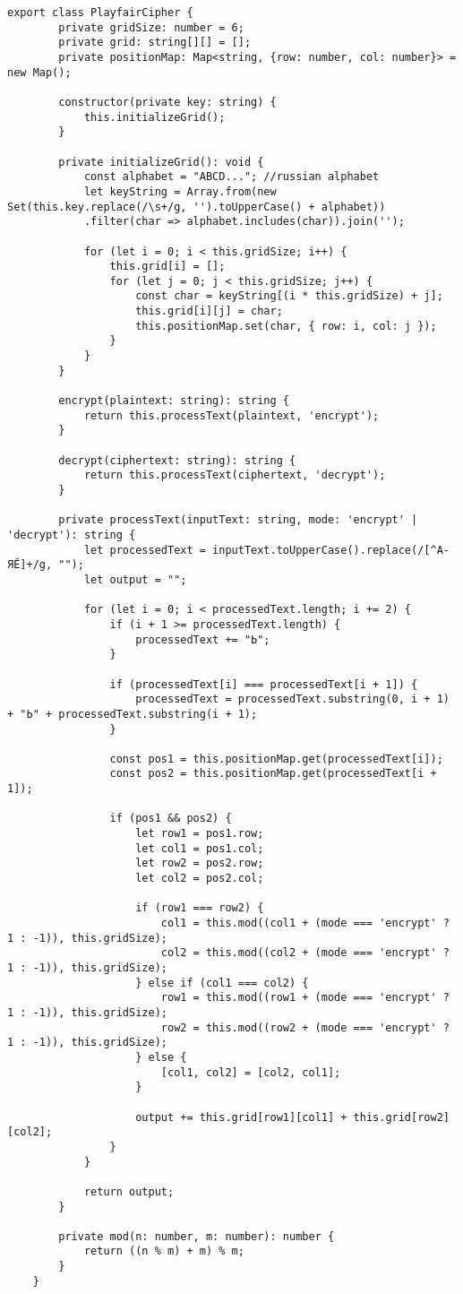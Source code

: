 \begin{lstlisting}[caption={Playfair шифр}, label=lst:gf1]
	export class PlayfairCipher {
		private gridSize: number = 6;
		private grid: string[][] = [];
		private positionMap: Map<string, {row: number, col: number}> = new Map();
		
		constructor(private key: string) {
			this.initializeGrid();
		}
		
		private initializeGrid(): void {
			const alphabet = "ABCD..."; //russian alphabet
			let keyString = Array.from(new Set(this.key.replace(/\s+/g, '').toUpperCase() + alphabet))
			.filter(char => alphabet.includes(char)).join('');
			
			for (let i = 0; i < this.gridSize; i++) {
				this.grid[i] = [];
				for (let j = 0; j < this.gridSize; j++) {
					const char = keyString[(i * this.gridSize) + j];
					this.grid[i][j] = char;
					this.positionMap.set(char, { row: i, col: j });
				}
			}
		}
		
		encrypt(plaintext: string): string {
			return this.processText(plaintext, 'encrypt');
		}
		
		decrypt(ciphertext: string): string {
			return this.processText(ciphertext, 'decrypt');
		}
		
		private processText(inputText: string, mode: 'encrypt' | 'decrypt'): string {
			let processedText = inputText.toUpperCase().replace(/[^А-ЯЁ]+/g, "");
			let output = "";
			
			for (let i = 0; i < processedText.length; i += 2) {
				if (i + 1 >= processedText.length) {
					processedText += "Ь";
				}
				
				if (processedText[i] === processedText[i + 1]) {
					processedText = processedText.substring(0, i + 1) + "Ь" + processedText.substring(i + 1);
				}
				
				const pos1 = this.positionMap.get(processedText[i]);
				const pos2 = this.positionMap.get(processedText[i + 1]);
				
				if (pos1 && pos2) {
					let row1 = pos1.row;
					let col1 = pos1.col;
					let row2 = pos2.row;
					let col2 = pos2.col;
					
					if (row1 === row2) {
						col1 = this.mod((col1 + (mode === 'encrypt' ? 1 : -1)), this.gridSize);
						col2 = this.mod((col2 + (mode === 'encrypt' ? 1 : -1)), this.gridSize);
					} else if (col1 === col2) {
						row1 = this.mod((row1 + (mode === 'encrypt' ? 1 : -1)), this.gridSize);
						row2 = this.mod((row2 + (mode === 'encrypt' ? 1 : -1)), this.gridSize);
					} else {
						[col1, col2] = [col2, col1];
					}
					
					output += this.grid[row1][col1] + this.grid[row2][col2];
				}
			}
			
			return output;
		}
		
		private mod(n: number, m: number): number {
			return ((n % m) + m) % m;
		}
	}
\end{lstlisting}



